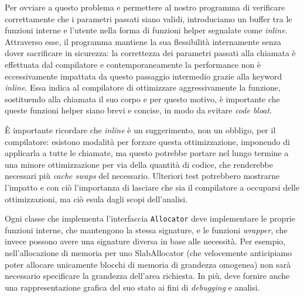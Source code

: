 Per ovviare a questo problema e permettere al nostro programma di verificare correttamente che i parametri passati siano validi, introduciamo un buffer tra le funzioni interne e l’utente nella forma di funzioni helper segnalate come \textit{inline}. Attraverso esse, il programma mantiene la sua flessibilità internamente senza dover sacrificare in sicurezza: la correttezza dei parametri passati alla chiamata è effettuata dal compilatore e contemporaneamente la performance non è eccessivamente impattata da questo passaggio intermedio grazie alla keyword \textit{inline}. Essa indica al compilatore di ottimizzare aggressivamente la funzione, sostituendo alla chiamata il suo corpo e per questo motivo, è importante che queste funzioni helper siano brevi e concise, in modo da evitare \textit{code bloat}.

È importante ricordare che \textit{inline} è un suggerimento, non un obbligo, per il compilatore: esistono modalità per forzare questa ottimizzazione, imponendo di applicarla a tutte le chiamate, ma questo potrebbe portare nel lungo termine a una minore ottimizzazione per via della quantità di codice, che renderebbe necessari più \textit{cache swaps} del necessario. Ulteriori test potrebbero mostrarne l’impatto e con ciò l’importanza di lasciare che sia il compilatore a occuparsi delle ottimizzazioni, ma ciò esula dagli scopi dell’analisi.

Ogni classe che implementa l’interfaccia \texttt{Allocator} deve implementare le proprie funzioni interne, che mantengono la stessa signature, e le funzioni \textit{wrapper}, che invece possono avere una signature diversa in base alle necessità. Per esempio, nell’allocazione di memoria per uno SlabAllocator (che velocemente anticipiamo poter allocare unicamente blocchi di memoria di grandezza omogenea) non sarà necessario specificare la grandezza dell’area richiesta. In più, deve fornire anche una rappresentazione grafica del suo stato ai fini di \textit{debugging} e analisi.

